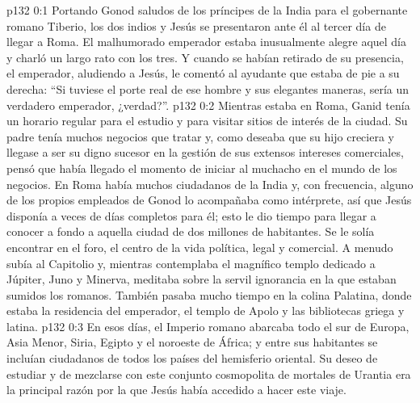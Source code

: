 \author{Comisión de seres intermedios}
\vs p132 0:1 Portando Gonod saludos de los príncipes de la India para el gobernante romano Tiberio, los dos indios y Jesús se presentaron ante él al tercer día de llegar a Roma. El malhumorado emperador estaba inusualmente alegre aquel día y charló un largo rato con los tres. Y cuando se habían retirado de su presencia, el emperador, aludiendo a Jesús, le comentó al ayudante que estaba de pie a su derecha: “Si tuviese el porte real de ese hombre y sus elegantes maneras, sería un verdadero emperador, ¿verdad?”.
\vs p132 0:2 \pc Mientras estaba en Roma, Ganid tenía un horario regular para el estudio y para visitar sitios de interés de la ciudad. Su padre tenía muchos negocios que tratar y, como deseaba que su hijo creciera y llegase a ser su digno sucesor en la gestión de sus extensos intereses comerciales, pensó que había llegado el momento de iniciar al muchacho en el mundo de los negocios. En Roma había muchos ciudadanos de la India y, con frecuencia, alguno de los propios empleados de Gonod lo acompañaba como intérprete, así que Jesús disponía a veces de días completos para él; esto le dio tiempo para llegar a conocer a fondo a aquella ciudad de dos millones de habitantes. Se le solía encontrar en el foro, el centro de la vida política, legal y comercial. A menudo subía al Capitolio y, mientras contemplaba el magnífico templo dedicado a Júpiter, Juno y Minerva, meditaba sobre la servil ignorancia en la que estaban sumidos los romanos. También pasaba mucho tiempo en la colina Palatina, donde estaba la residencia del emperador, el templo de Apolo y las bibliotecas griega y latina.
\vs p132 0:3 \pc En esos días, el Imperio romano abarcaba todo el sur de Europa, Asia Menor, Siria, Egipto y el noroeste de África; y entre sus habitantes se incluían ciudadanos de todos los países del hemisferio oriental. Su deseo de estudiar y de mezclarse con este conjunto cosmopolita de mortales de Urantia era la principal razón por la que Jesús había accedido a hacer este viaje.

